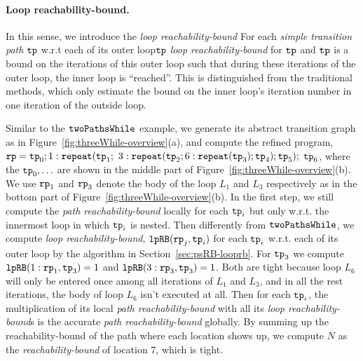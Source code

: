 \paragraph{Loop reachability-bound.}
In this sense, we introduce the \emph{loop reachability-bound}
For each \emph{simple transition path} $\mathtt{tp}$ w.r.t each of its outer loop$\mathtt{tp}$
\emph{loop reachability-bound} for $\mathtt{tp}$ and $\mathtt{tp}$
is a bound on the iterations of
this outer loop
such that during these iterations of the outer loop, the inner loop is ``reached''. 
This is distinguished from the traditional methods, which only estimate the bound on the inner loop's iteration number
in one iteration of the outside loop.


Similar to the $\mathtt{twoPathsWhile}$ example, we generate its abstract transition graph as in Figure~\ref{fig:threeWhile-overview}(a),
and compute the refined program,
$\mathtt{rp} = \mathtt{tp}_0; 1: \mathtt{repeat}(\mathtt{tp}_1;$ 
$3: {\mathtt{repeat}(\mathtt{tp}_2; 6 : {\mathtt{repeat}(\mathtt{tp}_3)}; \mathtt{tp}_4)}; \mathtt{tp}_5);$ 
$\mathtt{tp}_6$,
where the $\mathtt{tp}_0, \ldots$ are shown in the middle part of Figure~\ref{fig:threeWhile-overview}(b).
We use $\mathtt{rp}_1$ and $\mathtt{rp}_3$ denote the body of the loop $L_1$ and $L_3$ respectively as in the bottom part of Figure~\ref{fig:threeWhile-overview}(b).
In the first step, we still compute the \emph{path reachability-bound} locally for each $\mathtt{tp}_i$ but only w.r.t. the innermost loop in which $\mathtt{tp}_i$ is nested.
Then differently from $\mathtt{twoPathsWhile}$,
we compute \emph{loop reachability-bound}, $\mathtt{lpRB}(\mathtt{rp}_j, \mathtt{tp}_i)$ for each $\mathtt{tp}_i$ w.r.t. each of its outer loop by the algorithm in Section~\ref{sec:psRB-looprb}.
For $\mathtt{tp}_3$ we compute
$\mathtt{lpRB}(1: \mathtt{rp}_1, \mathtt{tp}_3) = 1$ and
$\mathtt{lpRB}(3: \mathtt{rp}_3, \mathtt{tp}_3) = 1$.
Both are tight because loop $L_6$ will only be entered once among all iterations of $L_1$ and $L_3$, and in all the rest iterations, the body of loop $L_6$ isn't executed at all.
Then for each $\mathtt{tp}_i$, the multiplication of its local \emph{path reachability-bound} with all its \emph{loop reachability-bound}s is the accurate \emph{path reachability-bound} globally.
By summing up the reachability-bound of the path where each location shows up,
we compute $N$ as the \emph{reachability-bound} of location $7$, which is tight.

